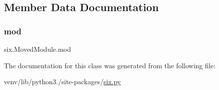 \subsection{Member Data Documentation}
\mbox{\label{classsix_1_1MovedModule_a5eb73a4cdceda205a0342cadabce63d9}} 
\subsubsection{\texorpdfstring{mod}{mod}}
{\footnotesize\ttfamily six.\+Moved\+Module.\+mod}



The documentation for this class was generated from the following file\+:\begin{DoxyCompactItemize}
\item 
venv/lib/python3./site-\/packages/\hyperlink{six_8py}{six.\+py}\end{DoxyCompactItemize}
